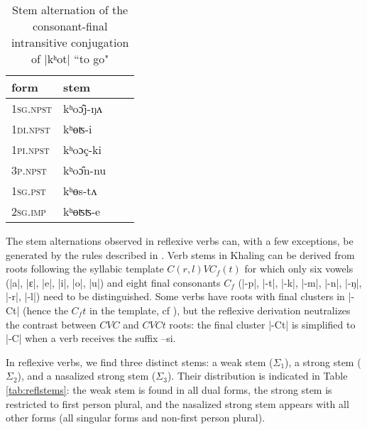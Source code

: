 \documentclass[twoside,a4paper,11pt]{article}
\newcommand{\ipa}[1]{{\phon#1}}
\newcommand{\ra}{$\Sigma_1$}
\newcommand{\rbb}{$\Sigma_2$}
\newcommand{\rc}{$\Sigma_3$}
\begin{document}
\begin{table}[H]
\caption{Stem alternation of  the consonant-final intransitive conjugation  of |\ipa{kʰot}| ``to go"} \label{tab:khot} \centering
\begin{tabular}{llll}
\toprule
form&stem\\
\midrule
\textsc{1sg.npst}&\ipa{kʰoɔ̂j-ŋʌ} \\
\textsc{1di.npst}&\ipa{kʰɵʦ-i} \\
\textsc{1pi.npst}&\ipa{kʰoɔç-ki} \\
\textsc{3p.npst}&\ipa{kʰoɔ̂n-nu} \\
\textsc{1sg.pst}&\ipa{kʰɵs-tʌ} \\
\textsc{2sg.imp}&\ipa{kʰɵʦʦ-e} \\
\bottomrule
\end{tabular}
\end{table}

The stem  alternations observed in reflexive verbs can, with a few exceptions, be generated by the rules  described in  \citet[1108-1111]{jacques12khaling}. Verb stems in Khaling can be derived from roots following the syllabic template $C(r,l)VC_f(t)$ for which only six vowels (|\ipa{a}|, |\ipa{ɛ}|, |\ipa{e}|, |\ipa{i}|, |\ipa{o}|, |\ipa{u}|) and eight final consonants $C_f$ (|\ipa{-p}|, |\ipa{-t}|, |\ipa{-k}|, |\ipa{-m}|, |\ipa{-n}|, |\ipa{-ŋ}|, |\ipa{-r}|, |\ipa{-l}|) need to be distinguished. Some verbs have roots with final clusters in |\ipa{-Ct}| (hence the $C_ft$ in the template, cf \citealt[1119-1122]{jacques12khaling}), but the reflexive derivation neutralizes the contrast between $CVC$ and $CVCt$ roots: the final cluster |\ipa{-Ct}| is simplified to |\ipa{-C}| when a verb receives the suffix --\ipa{si}.

In reflexive verbs, we find three distinct stems: a weak stem (\ra{}), a strong stem (\rbb{}), and a nasalized strong stem (\rc{}). Their distribution is indicated in Table \ref{tab:reflstems}: 
the weak stem is found in all dual forms, the strong stem is restricted to first person plural, and the nasalized strong stem appears with all other forms (all singular forms and non-first person plural).
\end{document}
